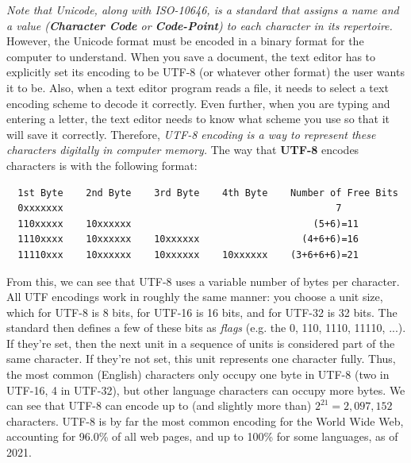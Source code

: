 \documentclass{article}
\begin{document}
  \textit{Note that Unicode, along with ISO-10646, is a standard that assigns a name and a value (\textbf{Character Code} or \textbf{Code-Point}) to each character in its repertoire.} However, the Unicode format must be encoded in a binary format for the computer to understand. When you save a document, the text editor has to explicitly set its encoding to be UTF-8 (or whatever other format) the user wants it to be. Also, when a text editor program reads a file, it needs to select a text encoding scheme to decode it correctly. Even further, when you are typing and entering a letter, the text editor needs to know what scheme you use so that it will save it correctly. Therefore, \textit{UTF-8 encoding is a way to represent these characters digitally in computer memory.} The way that \textbf{UTF-8} encodes characters is with the following format:
  \begin{lstlisting}
  1st Byte    2nd Byte    3rd Byte    4th Byte    Number of Free Bits   
  0xxxxxxx                                                7             
  110xxxxx    10xxxxxx                                (5+6)=11          
  1110xxxx    10xxxxxx    10xxxxxx                  (4+6+6)=16         
  11110xxx    10xxxxxx    10xxxxxx    10xxxxxx    (3+6+6+6)=21         
  \end{lstlisting}
  From this, we can see that UTF-8 uses a variable number of bytes per character. All UTF encodings work in roughly the same manner: you choose a unit size, which for UTF-8 is 8 bits, for UTF-16 is 16 bits, and for UTF-32 is 32 bits. The standard then defines a few of these bits as \textit{flags} (e.g. the 0, 110, 1110, 11110, ...). If they're set, then the next unit in a sequence of units is considered part of the same character. If they're not set, this unit represents one character fully. Thus, the most common (English) characters only occupy one byte in UTF-8 (two in UTF-16, 4 in UTF-32), but other language characters can occupy more bytes. We can see that UTF-8 can encode up to (and slightly more than) $2^{21} = 2,097,152$ characters. UTF-8 is by far the most common encoding for the World Wide Web, accounting for 96.0\% of all web pages, and up to 100\% for some languages, as of 2021.
\end{document}
